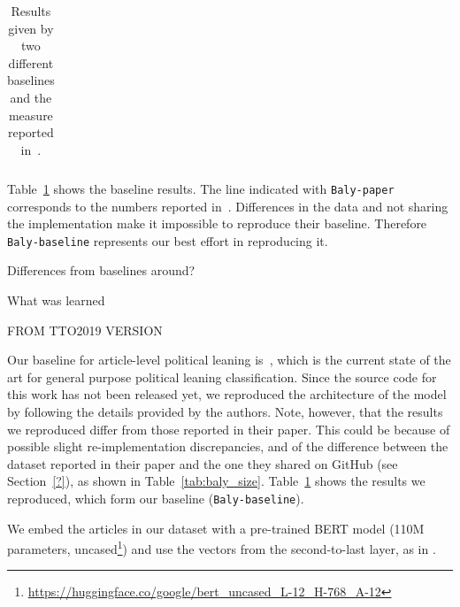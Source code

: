\begin{table}[!htbp]
\begin{tabular}{l|rr|rr}
    \end{tabular}
    \caption{Results given by two different baselines and the measure reported in~\citet{baly2020we}.}
    \label{tab:results_baselines_classifier}
\end{table}

Table~\ref{tab:results_baselines_classifier} shows the baseline results.
The line indicated with \texttt{Baly-paper} corresponds to the numbers reported in~\citet{baly2020we}.
Differences in the data and not sharing the implementation make it impossible to reproduce their baseline.
Therefore \texttt{Baly-baseline} represents our best effort in reproducing it.


Differences from baselines around?

What was learned



FROM TTO2019 VERSION

Our baseline for article-level political leaning is~\citet{baly2020we}, which is the current state of the art for general purpose political leaning classification.
Since the source code for this work has not been released yet, we reproduced the architecture of the model by following the details provided by the authors. %
Note, however, that the results we reproduced differ from those reported in their paper. This could be because of possible slight re-implementation discrepancies, and of the difference between the dataset reported in their paper and the one they shared on GitHub (see Section~\ref{?}), as shown in Table~\ref{tab:baly_size}.%
Table~\ref{tab:results_baselines_classifier} shows the results we reproduced, which form our baseline (\texttt{Baly-baseline}). %




We embed the articles in our dataset with a pre-trained BERT model (110M parameters, uncased\footnote{\url{https://huggingface.co/google/bert_uncased_L-12_H-768_A-12}}) and use the vectors from the second-to-last layer, as in \citet{baly2020we}. %

